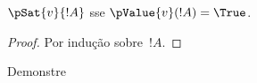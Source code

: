 \documentclass[../../../include/open-logic-section]{subfiles}
\begin{document}
\begin{prop}
  $\pSat{v}{!A}$ sse $\pValue{v}(!A) = \True$.
\end{prop}

\begin{proof}
  Por indução sobre~$!A$.
\end{proof}

\begin{prob}
  Demonstre 
\end{prob}
\end{document}
